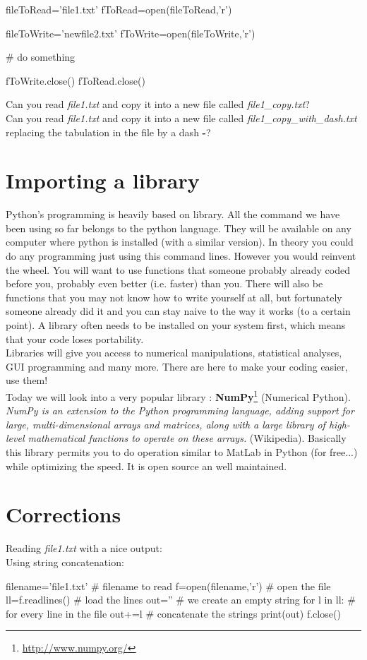 \documentclass[article,10pt]{scrartcl}
\begin{document}
\begin{python}
fileToRead='file1.txt'
fToRead=open(fileToRead,'r')

fileToWrite='newfile2.txt'
fToWrite=open(fileToWrite,'r')

# do something

fToWrite.close()
fToRead.close()
\end{python}

Can you read \textit{file1.txt} and copy it into a new file called \textit{file1\_copy.txt}?\\
Can you read \textit{file1.txt} and copy it into a new file called \textit{file1\_copy\_with\_dash.txt} replacing the tabulation in the file by a dash \textbf{-}? \\

\section*{Importing a library}
Python's programming is heavily based on library. All the command we have been using so far belongs to the python language. They will be available on any computer where python is installed (with a similar version). In theory you could do any programming just using this command lines. However you would reinvent the wheel. You will want to use functions that someone probably already coded before you, probably even better (i.e. faster) than you. There will also be functions that you may not know how to write yourself at all, but fortunately someone already did it and you can stay naive to the way it works (to a certain point). A library often needs to be installed on your system first, which means that your code loses portability. \\
Libraries will give you access to numerical manipulations, statistical analyses, GUI programming and many more. There are here to make your coding easier, use them!
\\
Today we will look into a very popular library : \textbf{NumPy}\footnote{\url{http://www.numpy.org/}} (Numerical Python). \textit{NumPy is an extension to the Python programming language, adding support for large, multi-dimensional arrays and matrices, along with a large library of high-level mathematical functions to operate on these arrays.} (Wikipedia). Basically this library permits you to do operation similar to MatLab in Python (for free...) while optimizing the speed. It is open source an well maintained.\\


\section*{Corrections}
Reading \textit{file1.txt} with a nice output:\\
\label{ex1}
Using string concatenation:\\
\begin{python}
filename='file1.txt' # filename to read
f=open(filename,'r') # open the file
ll=f.readlines() # load the lines
out='' # we create an empty string
for l in ll: # for every line in the file
   out+=l # concatenate the strings
print(out)
f.close()
\end{python}
\end{document}
